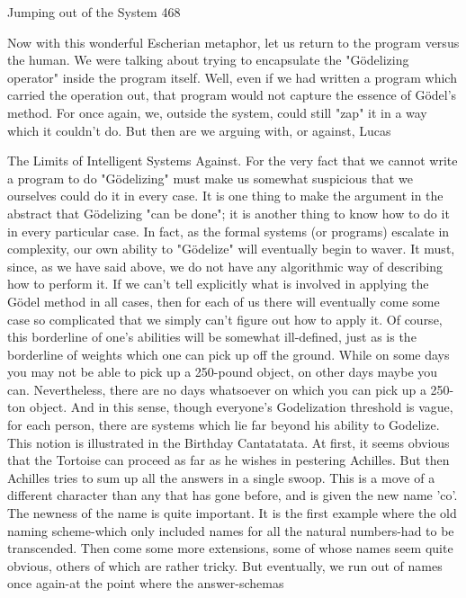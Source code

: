 {Jumping out of the System                                                                   468

        Now with this wonderful Escherian metaphor, let us return to the program versus
the human. We were talking about trying to encapsulate the "Gödelizing operator" inside
the program itself. Well, even if we had written a program which carried the operation
out, that program would not capture the essence of Gödel’s method. For once again, we,
outside the system, could still "zap" it in a way which it couldn't do. But then are we
arguing with, or against, Lucas

                         The Limits of Intelligent Systems
Against. For the very fact that we cannot write a program to do "Gödelizing" must make
us somewhat suspicious that we ourselves could do it in every case. It is one thing to
make the argument in the abstract that Gödelizing "can be done"; it is another thing to
know how to do it in every particular case. In fact, as the formal systems (or programs)
escalate in complexity, our own ability to "Gödelize" will eventually begin to waver. It
must, since, as we have said above, we do not have any algorithmic way of describing
how to perform it. If we can't tell explicitly what is involved in applying the Gödel
method in all cases, then for each of us there will eventually come some case so
complicated that we simply can't figure out how to apply it.
         Of course, this borderline of one's abilities will be somewhat ill-defined, just as is
the borderline of weights which one can pick up off the ground. While on some days you
may not be able to pick up a 250-pound object, on other days maybe you can.
Nevertheless, there are no days whatsoever on which you can pick up a 250-ton object.
And in this sense, though everyone's Godelization threshold is vague, for each person,
there are systems which lie far beyond his ability to Godelize.
         This notion is illustrated in the Birthday Cantatatata. At first, it seems obvious
that the Tortoise can proceed as far as he wishes in pestering Achilles. But then Achilles
tries to sum up all the answers in a single swoop. This is a move of a different character
than any that has gone before, and is given the new name 'co'. The newness of the name
is quite important. It is the first example where the old naming scheme-which only
included names for all the natural numbers-had to be transcended. Then come some more
extensions, some of whose names seem quite obvious, others of which are rather tricky.
But eventually, we run out of names once again-at the point where the answer-schemas

}
